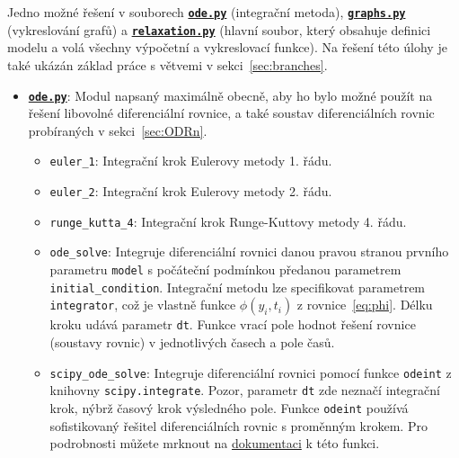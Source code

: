 \documentclass[a4paper,11pt,twoside]{article}
\def\code#1{\textnormal{\texttt{#1}}}
\def\ghfile#1#2{\textnormal{\textbf{\texttt{\href{https://github.com/PavelStransky/PCInPhysics/blob/main/#1#2}{#2}}}}}
\theoremstyle{red}
\theoremstyle{green}
\begin{document}
\setcounter{solution}{1}
\begin{solution}
    \label{sol:ODR1}
    Jedno možné řešení v souborech \ghfile{python/ode/}{ode.py} (integrační metoda), \ghfile{python/ode/}{graphs.py} (vykreslování grafů) a \ghfile{python/ode/}{relaxation.py} (hlavní soubor, který obsahuje definici modelu a volá všechny výpočetní a vykreslovací funkce).
    Na řešení této úlohy je také ukázán základ práce s větvemi v sekci~\ref{sec:branches}.
    
    \begin{itemize}
    \item \ghfile{python/ode/}{ode.py}: 
        Modul napsaný maximálně obecně, aby ho bylo možné použít na řešení libovolné diferenciální rovnice, a také soustav diferenciálních rovnic probíraných v sekci~\ref{sec:ODRn}.
        
        \begin{itemize}
        \item \code{euler_1}: 
            Integrační krok Eulerovy metody 1. řádu.
        \item \code{euler_2}: 
            Integrační krok Eulerovy metody 2. řádu.
        \item \code{runge_kutta_4}: 
            Integrační krok Runge-Kuttovy metody 4. řádu.
        \item \code{ode_solve}: 
            Integruje diferenciální rovnici danou pravou stranou prvního parametru \code{model} s počáteční podmínkou předanou parametrem \code{initial_condition}. 
            Integrační metodu lze specifikovat parametrem \code{integrator}, což je vlastně funkce $\phi(y_{i}, t_{i})$ z rovnice~\eqref{eq:phi}. 
            Délku kroku udává parametr \code{dt}.
            Funkce vrací pole hodnot řešení rovnice (soustavy rovnic) v jednotlivých časech a pole časů.
        \item \code{scipy_ode_solve}: 
            Integruje diferenciální rovnici pomocí funkce \code{odeint} z knihovny \code{sci\-py.integrate}. 
            Pozor, parametr \code{dt} zde neznačí integrační krok, nýbrž časový krok výsledného pole.
            Funkce \code{odeint} používá sofistikovaný řešitel diferenciálních rovnic s proměnným krokem.
            Pro podrobnosti můžete mrknout na \href{https://docs.scipy.org/doc/scipy/reference/generated/scipy.integrate.odeint.html}{dokumentaci} k této funkci.
    \end{itemize}


\end{itemize}
\end{solution}
\end{document}
